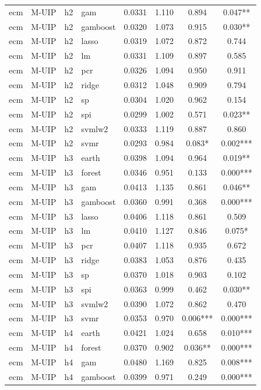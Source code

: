 \begin{ThreePartTable}
\begin{longtable}[t]{llclcccc}
ecm & M-UIP & h2 & gam & 0.0331 & 1.110 & 0.894 & 0.047**\\
ecm & M-UIP & h2 & gamboost & 0.0320 & 1.073 & 0.915 & 0.030**\\
ecm & M-UIP & h2 & lasso & 0.0319 & 1.072 & 0.872 & 0.744\\
ecm & M-UIP & h2 & lm & 0.0331 & 1.109 & 0.897 & 0.585\\
ecm & M-UIP & h2 & pcr & 0.0326 & 1.094 & 0.950 & 0.911\\
ecm & M-UIP & h2 & ridge & 0.0312 & 1.048 & 0.909 & 0.794\\
ecm & M-UIP & h2 & sp & 0.0304 & 1.020 & 0.962 & 0.154\\
ecm & M-UIP & h2 & spi & 0.0299 & 1.002 & 0.571 & 0.023**\\
ecm & M-UIP & h2 & svmlw2 & 0.0333 & 1.119 & 0.887 & 0.860\\
ecm & M-UIP & h2 & svmr & 0.0293 & 0.984 & 0.083* & 0.002***\\
\addlinespace
ecm & M-UIP & h3 & earth & 0.0398 & 1.094 & 0.964 & 0.019**\\
ecm & M-UIP & h3 & forest & 0.0346 & 0.951 & 0.133 & 0.000***\\
ecm & M-UIP & h3 & gam & 0.0413 & 1.135 & 0.861 & 0.046**\\
ecm & M-UIP & h3 & gamboost & 0.0360 & 0.991 & 0.368 & 0.000***\\
ecm & M-UIP & h3 & lasso & 0.0406 & 1.118 & 0.861 & 0.509\\
ecm & M-UIP & h3 & lm & 0.0410 & 1.127 & 0.846 & 0.075*\\
ecm & M-UIP & h3 & pcr & 0.0407 & 1.118 & 0.935 & 0.672\\
ecm & M-UIP & h3 & ridge & 0.0383 & 1.053 & 0.876 & 0.435\\
ecm & M-UIP & h3 & sp & 0.0370 & 1.018 & 0.903 & 0.102\\
ecm & M-UIP & h3 & spi & 0.0363 & 0.999 & 0.462 & 0.030**\\
ecm & M-UIP & h3 & svmlw2 & 0.0390 & 1.072 & 0.862 & 0.470\\
ecm & M-UIP & h3 & svmr & 0.0353 & 0.970 & 0.006*** & 0.000***\\
\addlinespace
ecm & M-UIP & h4 & earth & 0.0421 & 1.024 & 0.658 & 0.010***\\
ecm & M-UIP & h4 & forest & 0.0370 & 0.902 & 0.036** & 0.000***\\
ecm & M-UIP & h4 & gam & 0.0480 & 1.169 & 0.825 & 0.008***\\
ecm & M-UIP & h4 & gamboost & 0.0399 & 0.971 & 0.249 & 0.000***\\

\end{longtable}
\end{ThreePartTable}
